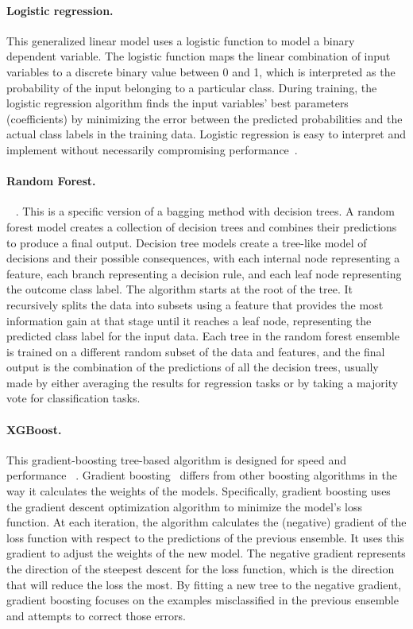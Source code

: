 \documentclass[oneside, a4paper, onecolumn, 11pt]{article}
\begin{document}
\begin{refsection}
\paragraph{Logistic regression.} This generalized linear model uses a logistic function to model a binary dependent variable. The logistic function maps the linear combination of input variables to a discrete binary value between 0 and 1, which is interpreted as the probability of the input belonging to a particular class. During training, the logistic regression algorithm finds the input variables' best parameters (coefficients) by minimizing the error between the predicted probabilities and the actual class labels in the training data. Logistic regression is easy to interpret and implement without necessarily compromising performance~\autocite{Levy2020-sm}.

\paragraph{Random Forest.}~\autocite{Breiman2001-ik,Biau2016-ns} . This is a specific version of a bagging method with decision trees. A random forest model creates a collection of decision trees and combines their predictions to produce a final output. Decision tree models create a tree-like model of decisions and their possible consequences, with each internal node representing a feature, each branch representing a decision rule, and each leaf node representing the outcome class label. The algorithm starts at the root of the tree. It recursively splits the data into subsets using a feature that provides the most information gain at that stage until it reaches a leaf node, representing the predicted class label for the input data. Each tree in the random forest ensemble is trained on a different random subset of the data and features, and the final output is the combination of the predictions of all the decision trees, usually made by either averaging the results for regression tasks or by taking a majority vote for classification tasks.

\paragraph{XGBoost.} This gradient-boosting tree-based algorithm is designed for speed and performance ~\autocite{Chen2016-oy}. Gradient boosting~\autocite{Friedman2001-fc} differs from other boosting algorithms in the way it calculates the weights of the models. Specifically, gradient boosting uses the gradient descent optimization algorithm to minimize the model's loss function. At each iteration, the algorithm calculates the (negative) gradient of the loss function with respect to the predictions of the previous ensemble. It uses this gradient to adjust the weights of the new model. The negative gradient represents the direction of the steepest descent for the loss function, which is the direction that will reduce the loss the most. By fitting a new tree to the negative gradient, gradient boosting focuses on the examples misclassified in the previous ensemble and attempts to correct those errors.


\end{refsection}
\end{document}
